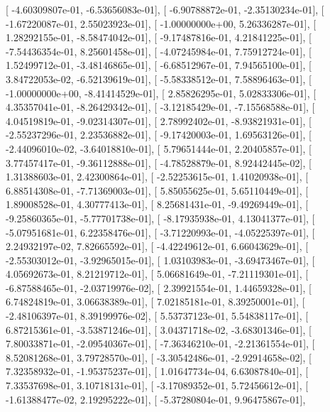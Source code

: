 \documentclass{article}
\begin{document}
       [ -4.60309807e-01,  -6.53656083e-01],
       [ -6.90788872e-01,  -2.35130234e-01],
       [ -1.67220087e-01,   2.55023923e-01],
       [ -1.00000000e+00,   5.26336287e-01],
       [  1.28292155e-01,  -8.58474042e-01],
       [ -9.17487816e-01,   4.21841225e-01],
       [ -7.54436354e-01,   8.25601458e-01],
       [ -4.07245984e-01,   7.75912724e-01],
       [  1.52499712e-01,  -3.48146865e-01],
       [ -6.68512967e-01,   7.94565100e-01],
       [  3.84722053e-02,  -6.52139619e-01],
       [ -5.58338512e-01,   7.58896463e-01],
       [ -1.00000000e+00,  -8.41414529e-01],
       [  2.85826295e-01,   5.02833306e-01],
       [  4.35357041e-01,  -8.26429342e-01],
       [ -3.12185429e-01,  -7.15568588e-01],
       [  4.04519819e-01,  -9.02314307e-01],
       [  2.78992402e-01,  -8.93821931e-01],
       [ -2.55237296e-01,   2.23536882e-01],
       [ -9.17420003e-01,   1.69563126e-01],
       [ -2.44096010e-02,  -3.64018810e-01],
       [  5.79651444e-01,   2.20405857e-01],
       [  3.77457417e-01,  -9.36112888e-01],
       [ -4.78528879e-01,   8.92442445e-02],
       [  1.31388603e-01,   2.42300864e-01],
       [ -2.52253615e-01,   1.41020938e-01],
       [  6.88514308e-01,  -7.71369003e-01],
       [  5.85055625e-01,   5.65110449e-01],
       [  1.89008528e-01,   4.30777413e-01],
       [  8.25681431e-01,  -9.49269449e-01],
       [ -9.25860365e-01,  -5.77701738e-01],
       [ -8.17935938e-01,   4.13041377e-01],
       [ -5.07951681e-01,   6.22358476e-01],
       [ -3.71220993e-01,  -4.05225397e-01],
       [  2.24932197e-02,   7.82665592e-01],
       [ -4.42249612e-01,   6.66043629e-01],
       [ -2.55303012e-01,  -3.92965015e-01],
       [  1.03103983e-01,  -3.69473467e-01],
       [  4.05692673e-01,   8.21219712e-01],
       [  5.06681649e-01,  -7.21119301e-01],
       [ -6.87588465e-01,  -2.03719976e-02],
       [  2.39921554e-01,   1.44659328e-01],
       [  6.74824819e-01,   3.06638389e-01],
       [  7.02185181e-01,   8.39250001e-01],
       [ -2.48106397e-01,   8.39199976e-02],
       [  5.53737123e-01,   5.54838117e-01],
       [  6.87215361e-01,  -3.53871246e-01],
       [  3.04371718e-02,  -3.68301346e-01],
       [  7.80033871e-01,  -2.09540367e-01],
       [ -7.36346210e-01,  -2.21361554e-01],
       [  8.52081268e-01,   3.79728570e-01],
       [ -3.30542486e-01,  -2.92914658e-02],
       [  7.32358932e-01,  -1.95375237e-01],
       [  1.01647734e-04,   6.63087840e-01],
       [  7.33537698e-01,   3.10718131e-01],
       [ -3.17089352e-01,   5.72456612e-01],
       [ -1.61388477e-02,   2.19295222e-01],
       [ -5.37280804e-01,   9.96475867e-01],
\end{document}
